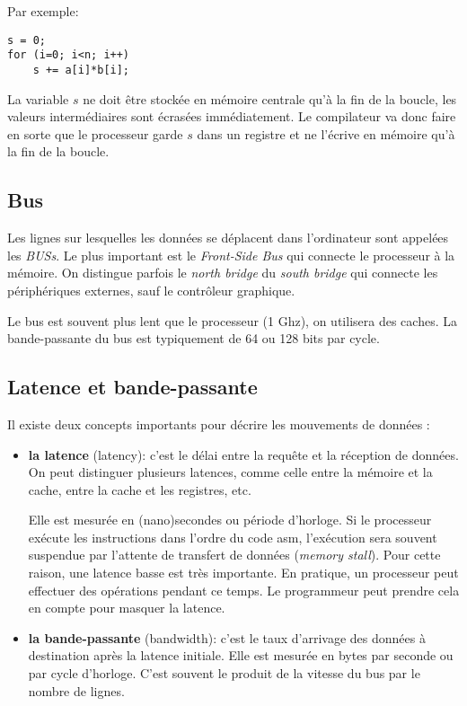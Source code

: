 Par exemple:
\begin{verbatim}
s = 0;
for (i=0; i<n; i++)
    s += a[i]*b[i];
\end{verbatim}

La variable $s$ ne doit être stockée en mémoire centrale qu'à la fin de la boucle, les valeurs intermédiaires sont écrasées immédiatement. Le compilateur va donc faire en sorte que le processeur garde $s$ dans un registre et ne l'écrive en mémoire qu'à la fin de la boucle.

	\subsection{Bus}

Les lignes sur lesquelles les données se déplacent dans l'ordinateur sont appelées les \textit{BUSs}. Le plus important est le \textit{Front-Side Bus} qui connecte le processeur à la mémoire. On distingue parfois le \textit{north bridge} du \textit{south bridge} qui connecte les périphériques externes, sauf le contrôleur graphique.


Le bus est souvent plus lent que le processeur (1 Ghz), on utilisera des caches. La bande-passante du bus est typiquement de 64 ou 128 bits par cycle.
	
	\subsection{Latence et bande-passante}

Il existe deux concepts importants pour décrire les mouvements de données :
\begin{itemize}
	\item \textbf{la latence} (latency):
c'est le délai entre la requête et la réception de données. On peut distinguer plusieurs latences, comme celle entre la mémoire et la cache, entre la cache et les registres, etc.

Elle est mesurée en (nano)secondes ou période d'horloge. Si le processeur exécute les instructions dans l'ordre du code asm, l'exécution sera souvent suspendue par l'attente de transfert de données (\textit{memory stall}). Pour cette raison, une latence basse est très importante. En pratique, un processeur peut effectuer des opérations pendant ce temps. Le programmeur peut prendre cela en compte pour masquer la latence. 
	\item \textbf{la bande-passante} (bandwidth): c'est le taux d'arrivage des données à destination après la latence initiale.
Elle est mesurée en bytes par seconde ou par cycle d'horloge. C'est souvent le produit de la vitesse du bus par le nombre de lignes.
\end{itemize}

